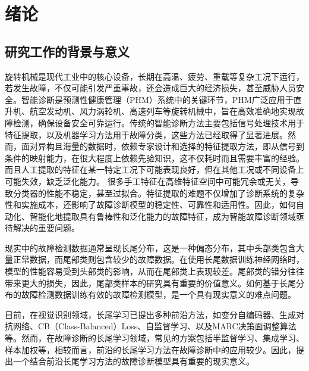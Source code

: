 \documentclass[master]{thesis-uestc}
\begin{document}
\thesistableofcontents

\chapter{绪\hspace{6pt}论}

\section{研究工作的背景与意义}
旋转机械是现代工业中的核心设备，长期在高温、疲劳、重载等复杂工况下运行，若发生故障，不仅可能引发严重事故，还会造成巨大的经济损失，甚至威胁人员安全。智能诊断是预测性健康管理（PHM）系统中的关键环节，PHM广泛应用于直升机、航空发动机、风力涡轮机、高速列车等旋转机械中，旨在高效准确地实现故障检测，确保设备安全可靠运行。传统的智能诊断方法主要包括信号处理技术用于特征提取，以及机器学习方法用于故障分类，这些方法已经取得了显著进展。然而，面对异构且海量的数据时，依赖专家设计和选择的特征提取方法，即从信号到条件的映射能力，在很大程度上依赖先验知识，这不仅耗时而且需要丰富的经验。而且人工提取的特征在某一特定工况下可能表现良好，但在其他工况或不同设备上可能失效，缺乏泛化能力。
很多手工特征在高维特征空间中可能冗余或无关，导致分类器的性能不稳定，甚至过拟合。特征提取的难题不仅增加了诊断系统的复杂性和实施成本，还影响了故障诊断模型的稳定性、可靠性和适用性。因此，如何自动化、智能化地提取具有鲁棒性和泛化能力的故障特征，成为智能故障诊断领域亟待解决的重要问题。

现实中的故障检测数据通常呈现长尾分布，这是一种偏态分布，其中头部类包含大量正常数据，而尾部类则包含较少的故障数据。在使用长尾数据训练神经网络时，模型的性能容易受到头部类的影响，从而在尾部类上表现较差。尾部类的错分往往带来更大的损失，因此，尾部类样本的研究具有重要的价值意义。如何基于长尾分布的故障检测数据训练有效的故障检测模型，是一个具有现实意义的难点问题。

目前，在视觉识别领域，长尾学习已提出多种前沿方法，如变分自编码器、生成对抗网络、CB（Class-Balanced）Loss、自监督学习、以及MARC决策面调整算法等。然而，在故障诊断的长尾学习领域，常见的方案包括半监督学习、集成学习、样本加权等，相较而言，前沿的长尾学习方法在故障诊断中的应用较少。因此，提出一个结合前沿长尾学习方法的故障诊断模型具有重要的现实意义。
\end{document}
